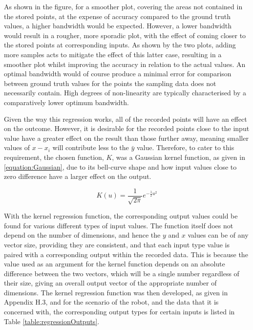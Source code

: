 \documentclass[11pt]{article}
\begin{document}
As shown in the figure, for a smoother plot, covering the areas not contained in the stored points, at the expense of accuracy compared to the ground truth values, a higher bandwidth would be expected. However, a lower bandwidth would result in a rougher, more sporadic plot, with the effect of coming closer to the stored points at corresponding inputs. As shown by the two plots, adding more samples acts to mitigate the effect of this latter case, resulting in a smoother plot whilst improving the accuracy in relation to the actual values. An optimal bandwidth would of course produce a minimal error for comparison between ground truth values for the points the sampling data does not necessarily contain. High degrees of non-linearity are typically characterised by a comparatively lower optimum bandwidth.

Given the way this regression works, all of the recorded points will have an effect on the outcome. However, it is desirable for the recorded points close to the input value have a greater effect on the result than those further away, meaning smaller values of $x - x_{i}$ will contribute less to the $\bar{y}$ value. Therefore, to cater to this requirement, the chosen function, $K$, was a Gaussian kernel function, as given in \eqref{equation:Gaussian}, due to its bell-curve shape and how input values close to zero difference have a larger effect on the output.

\begin{equation}\label{equation:Gaussian}
K(u) = \frac{1}{\sqrt{2\pi}}e^{-\frac{1}{2}u^2}
\end{equation}

With the kernel regression function, the corresponding output values could be found for various different types of input values. The function itself does not depend on the number of dimensions, and hence the $y$ and $x$ values can be of any vector size, providing they are consistent, and that each input type value is paired with a corresponding output within the recorded data. This is because the value used as an argument for the kernel function depends on an absolute difference between the two vectors, which will be a single number regardless of their size, giving an overall output vector of the appropriate number of dimensions. The kernel regression function was then developed, as given in Appendix H.3, and for the scenario of the robot, and the data that it is concerned with, the corresponding output types for certain inputs is listed in Table \ref{table:regressionOutputs}.
\end{document}
